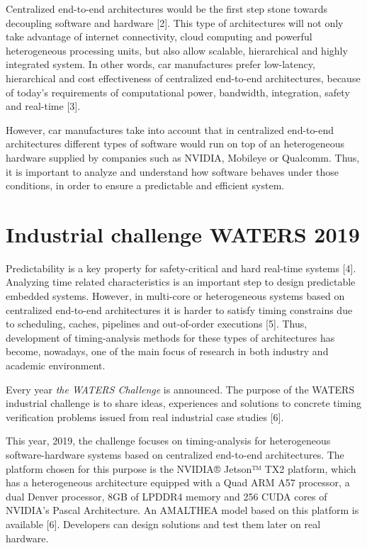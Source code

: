\documentclass[
  12pt,
  a4paperpaper,
]{report}
\begin{document}
Centralized end-to-end architectures would be the first step stone
towards decoupling software and hardware {[}2{]}. This type of
architectures will not only take advantage of internet connectivity,
cloud computing and powerful heterogeneous processing units, but also
allow scalable, hierarchical and highly integrated system.
In other words, car manufactures prefer low-latency,
hierarchical and cost effectiveness of centralized end-to-end
architectures, because of today's requirements of computational power,
bandwidth, integration, safety and real-time {[}3{]}.

However, car manufactures take into account that in centralized
end-to-end architectures different types of software would run on top
of an heterogeneous hardware supplied by companies such as NVIDIA,
Mobileye or Qualcomm. Thus, it is important to analyze and understand how
software behaves under those conditions, in order to ensure a
predictable and efficient system.

\hypertarget{industrial-challenge-waters-2019}{%
\section{Industrial challenge WATERS
2019}\label{industrial-challenge-waters-2019}}

Predictability is a key property for safety-critical and hard real-time
systems {[}4{]}. Analyzing time related characteristics is an important
step to design predictable embedded systems. However, in multi-core or
heterogeneous systems based on centralized end-to-end architectures it is
harder to satisfy timing constrains due to scheduling, caches,
pipelines and out-of-order executions {[}5{]}. 
Thus, development of timing-analysis methods for these types of
architectures has become, nowadays, one of the main focus of research in
both industry and academic environment.

Every year \emph{the WATERS Challenge} is announced.
The purpose of the WATERS industrial challenge is to
share ideas, experiences and solutions to concrete timing verification
problems issued from real industrial case studies {[}6{]}.

This year, 2019, the challenge focuses on timing-analysis for
heterogeneous software-hardware systems based on centralized end-to-end
architectures. The platform chosen for this purpose is the NVIDIA®
Jetson™ TX2 platform, which has a heterogeneous architecture equipped
with a Quad ARM A57 processor, a dual Denver processor, 8GB of LPDDR4
memory and 256 CUDA cores of NVIDIA's Pascal Architecture. 
An AMALTHEA model based on this platform is available {[}6{]}.
Developers can design solutions and test them later on real hardware.
\end{document}
